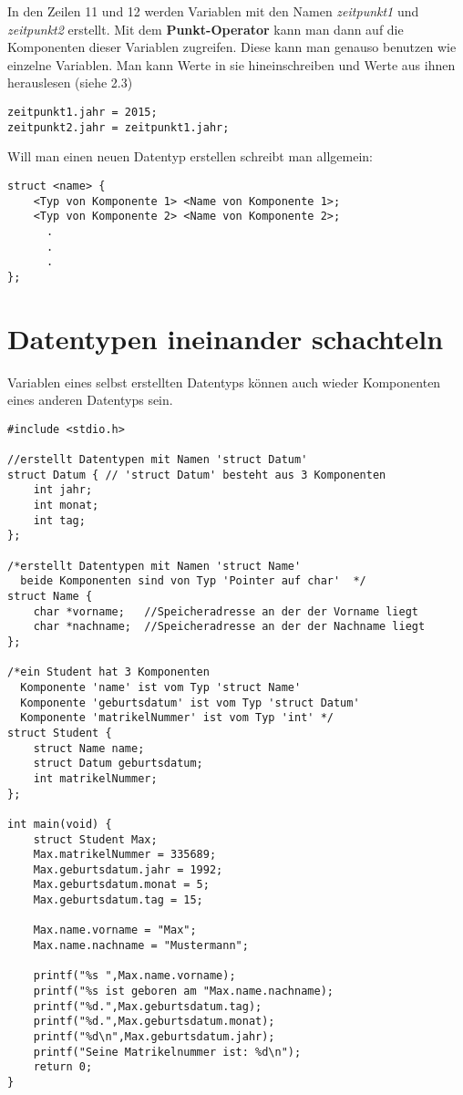 \documentclass[c_worksheet.tex]{subfiles}
\begin{document}
In den Zeilen 11 und 12 werden Variablen mit den Namen \textit{zeitpunkt1} und \textit{zeitpunkt2} erstellt. Mit dem \textbf{Punkt-Operator} kann man dann auf die Komponenten dieser Variablen zugreifen. Diese kann man genauso benutzen wie einzelne Variablen. Man kann Werte in sie hineinschreiben und Werte aus ihnen herauslesen (siehe 2.3)

\begin{lstlisting}
zeitpunkt1.jahr = 2015;
zeitpunkt2.jahr = zeitpunkt1.jahr;
\end{lstlisting}

Will man einen neuen Datentyp erstellen schreibt man allgemein:
\begin{lstlisting}
struct <name> {
    <Typ von Komponente 1> <Name von Komponente 1>;
    <Typ von Komponente 2> <Name von Komponente 2>;
      .
      .
      .
};
\end{lstlisting}

\section{Datentypen ineinander schachteln}

Variablen eines selbst erstellten Datentyps können auch wieder Komponenten eines anderen Datentyps sein.

\begin{lstlisting}
#include <stdio.h>

//erstellt Datentypen mit Namen 'struct Datum'
struct Datum { // 'struct Datum' besteht aus 3 Komponenten
    int jahr;
    int monat;
    int tag;
};

/*erstellt Datentypen mit Namen 'struct Name'
  beide Komponenten sind von Typ 'Pointer auf char'  */
struct Name { 
    char *vorname;   //Speicheradresse an der der Vorname liegt
    char *nachname;  //Speicheradresse an der der Nachname liegt
};

/*ein Student hat 3 Komponenten
  Komponente 'name' ist vom Typ 'struct Name'
  Komponente 'geburtsdatum' ist vom Typ 'struct Datum'
  Komponente 'matrikelNummer' ist vom Typ 'int' */
struct Student {
    struct Name name;
    struct Datum geburtsdatum; 
    int matrikelNummer; 
};

int main(void) {
    struct Student Max;
    Max.matrikelNummer = 335689;
    Max.geburtsdatum.jahr = 1992;
    Max.geburtsdatum.monat = 5;
    Max.geburtsdatum.tag = 15;

    Max.name.vorname = "Max";
    Max.name.nachname = "Mustermann";

    printf("%s ",Max.name.vorname);
    printf("%s ist geboren am "Max.name.nachname);
    printf("%d.",Max.geburtsdatum.tag);
    printf("%d.",Max.geburtsdatum.monat);
    printf("%d\n",Max.geburtsdatum.jahr);
    printf("Seine Matrikelnummer ist: %d\n");
    return 0;
}
\end{lstlisting}
\end{document}

